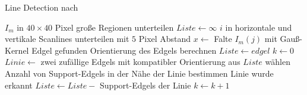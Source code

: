 \begin{algorithm}
	\caption{Line Detection nach \citeauthor{clarke96}}
	\label{src:lineDetection}
	\begin{algorithmic}[1]
		\State $I_m$ in $40 \times 40$ Pixel große Regionen unterteilen
			\State $Liste \gets \infty$
			\State $i$ in horizontale und vertikale Scanlines unterteilen mit $5$ Pixel Abstand
				\State $x \gets$ Falte $I_m\left(j\right)$ mit Gauß-Kernel
					\Comment Edgel gefunden
					\State Orientierung des Edgels berechnen
					\State $Liste \gets edgel$
				\EndIf
			\EndFor
			\State $k \gets 0$
					\State $Linie \gets$ zwei zufällige Edgels mit kompatibler Orientierung aus $Liste$ wählen
					\State Anzahl von Support-Edgels in der Nähe der Linie bestimmen
				\EndFor
					\Comment Linie wurde erkannt
					\State $Liste \gets Liste -$ Support-Edgels der Linie
				\EndIf
				\State $k \gets k + 1$
			\EndWhile
		\EndFor
	\EndProcedure
	\end{algorithmic}
\end{algorithm}
